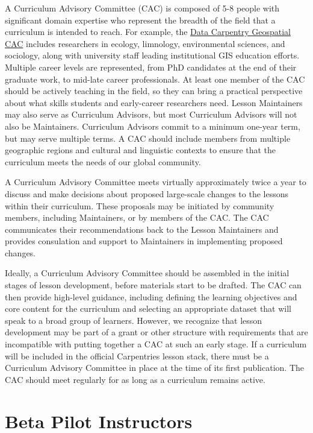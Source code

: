 \documentclass[]{book}
\begin{document}
A Curriculum Advisory Committee (CAC)
is composed of 5-8 people with significant domain expertise who represent the
breadth of the field that a curriculum is intended to reach. For example, the
\href{https://datacarpentry.org/lesson-leadership/}{Data Carpentry Geospatial CAC}
includes researchers in ecology, limnology, environmental sciences, and sociology,
along with university staff leading institutional GIS education efforts. Multiple
career levels are represented, from PhD candidates at the end of their graduate
work, to mid-late career professionals. At least one member of the CAC should
be actively teaching in the field, so they can bring a practical perspective
about what skills students and early-career researchers need. Lesson Maintainers
may also serve as Curriculum Advisors, but most Curriculum Advisors will not
also be Maintainers. Curriculum Advisors commit to a minimum one-year term, but
may serve multiple terms. A CAC should include members from multiple geographic
regions and cultural and linguistic contexts to ensure that the curriculum
meets the needs of our global community.

A Curriculum Advisory Committee meets virtually approximately twice a year to
discuss and make decisions about proposed large-scale
changes to the lessons within their curriculum. These proposals may be initiated
by community members, including Maintainers, or by members of the CAC. The CAC
communicates their recommendations back to the Lesson Maintainers and provides
consulation and support to Maintainers in implementing proposed changes.

Ideally, a Curriculum Advisory Committee should be assembled in the initial
stages of lesson development, before materials start to be drafted. The CAC
can then provide high-level guidance, including defining the learning objectives
and core content for the curriculum and selecting an appropriate dataset that
will speak to a broad group of learners. However, we recognize that lesson
development may be part of a grant or other structure with requirements that are
incompatible with putting together a CAC at such an early stage. If a curriculum
will be included in the official Carpentries lesson stack, there
must be a Curriculum Advisory Committee in place at the time of
its first publication. The CAC should meet regularly for as long as a curriculum
remains active.

\hypertarget{beta-pilot-instructors}{%
\section{Beta Pilot Instructors}\label{beta-pilot-instructors}}
\end{document}

